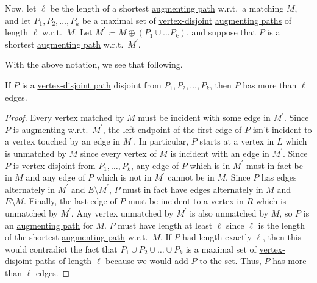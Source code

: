 Now, let \(\ell \) be the length of a shortest \hyperref[def:augmenting-path]{augmenting path} w.r.t.\ a matching \(M\), and let \(P_1, P_2, \dots  , P_k\) be a maximal set of \hyperref[def:vertex-independent]{vertex-disjoint} \hyperref[def:augmenting-path]{augmenting paths} of length \(\ell \) w.r.t.\ \(M\). Let \(M^\prime \coloneqq M\oplus (P_1 \cup \dots P_k )\), and suppose that \(P\) is a shortest \hyperref[def:augmenting-path]{augmenting path} w.r.t.\ \(M^\prime \).

With the above notation, we see that following.

\begin{lemma}\label{lma:lec25-3}
	If \(P\) is a \hyperref[def:vertex-independent]{vertex-disjoint path} disjoint from \(P_1, P_2, \dots , P_k \), then \(P\) has more than \(\ell \) edges.
\end{lemma}
\begin{proof}
	Every vertex matched by \(M\) must be incident with some edge in \(M^\prime \). Since \(P\) is \hyperref[def:augmenting-path]{augmenting} w.r.t.\ \(M^\prime \), the left endpoint of the first edge of \(P\) isn't incident to a vertex touched by an edge in \(M^\prime \). In particular, \(P\) starts at a vertex in \(L\) which is unmatched by \(M\) since every vertex of \(M\) is incident with an edge in \(M^\prime \). Since \(P\) is \hyperref[def:vertex-independent]{vertex-disjoint} from \(P_1, \dots  , P_k\), any edge of \(P\) which is in \(M^\prime \) must in fact be in \(M\) and any edge of \(P\) which is not in \(M^\prime \) cannot be in \(M\). Since \(P\) has edges alternately in \(M^\prime \) and \(E \setminus M^\prime \), \(P\) must in fact have edges alternately in \(M\) and \(E \setminus M\). Finally, the last edge of \(P\) must be incident to a vertex in \(R\) which is unmatched by \(M^\prime \). Any vertex unmatched by \(M^\prime \) is also unmatched by \(M\), so \(P\) is an \hyperref[def:augmenting-path]{augmenting path} for \(M\). \(P\) must have length at least \(\ell \) since \(\ell \) is the length of the shortest \hyperref[def:augmenting-path]{augmenting path} w.r.t.\ \(M\). If \(P\) had length exactly \(\ell \), then this would contradict the fact that \(P_1 \cup P_2 \cup \dots  \cup P_k\) is a maximal set of \hyperref[def:vertex-independent]{vertex-disjoint} \hyperref[def:path]{paths} of length \(\ell \) because we would add \(P\) to the set. Thus, \(P\) has more than \(\ell \) edges.
\end{proof}

